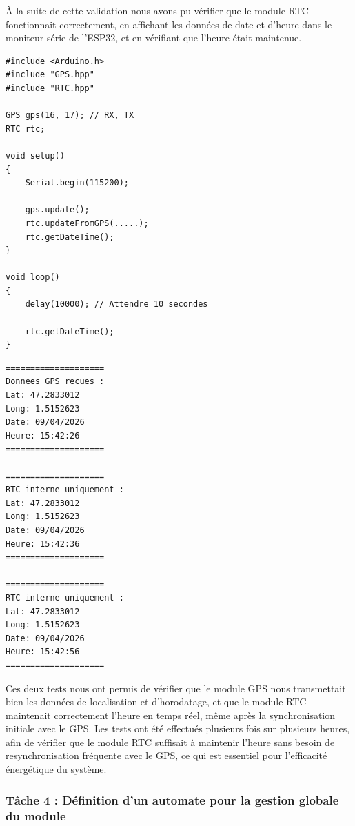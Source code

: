 À la suite de cette validation nous avons pu vérifier que le module RTC fonctionnait correctement, en affichant 
les données de date et d'heure dans le moniteur série de l'ESP32, et en vérifiant que l'heure était maintenue.
\\

\noindent
\begin{minipage}[t]{0.45\textwidth}
\begin{lstlisting}[style=CStyle, caption={Exemple utilisation module GPS + module RTC}, label={lst:gps_rtc_exemple}]
#include <Arduino.h>
#include "GPS.hpp"
#include "RTC.hpp"

GPS gps(16, 17); // RX, TX
RTC rtc;

void setup()
{
    Serial.begin(115200);

    gps.update();
    rtc.updateFromGPS(.....);
    rtc.getDateTime();
}

void loop()
{
    delay(10000); // Attendre 10 secondes 

    rtc.getDateTime();
}
\end{lstlisting}
\end{minipage}
\hfill
\begin{minipage}[t]{0.45\textwidth}
\begin{lstlisting}[style=CStyle, caption={Moniteur Série de l'ESP32}, label={lst:moniteur_exemple}]
====================
Donnees GPS recues :
Lat: 47.2833012
Long: 1.5152623
Date: 09/04/2026
Heure: 15:42:26
====================

====================
RTC interne uniquement :
Lat: 47.2833012
Long: 1.5152623
Date: 09/04/2026
Heure: 15:42:36
====================

====================
RTC interne uniquement :
Lat: 47.2833012
Long: 1.5152623
Date: 09/04/2026
Heure: 15:42:56
====================
\end{lstlisting}
\end{minipage}

Ces deux tests nous ont permis de vérifier que le module GPS nous transmettait bien les données de localisation et d'horodatage,
et que le module RTC maintenait correctement l'heure en temps réel, même après la synchronisation initiale avec le GPS.
Les tests ont été effectués plusieurs fois sur plusieurs heures, afin de vérifier que le module RTC suffisait à maintenir l'heure 
sans besoin de resynchronisation fréquente avec le GPS, ce qui est essentiel pour l'efficacité énergétique du système.
\\

\subsubsection{Tâche 4 : Définition d'un automate pour la gestion globale du module}

